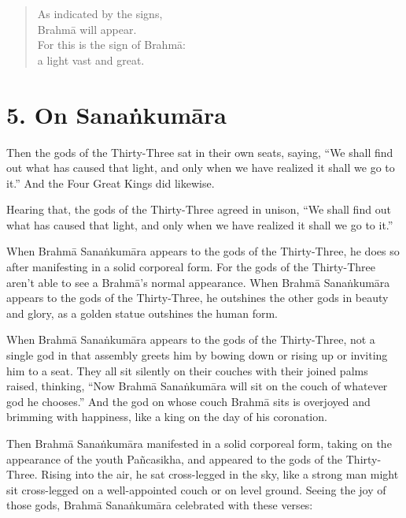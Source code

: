 \documentclass[12pt,openany]{book}%
\begin{document}
\begin{verse}%
As indicated by the signs, \\
\textsanskrit{Brahmā} will appear. \\
For this is the sign of \textsanskrit{Brahmā}: \\
a light vast and great. 

%
\end{verse}

\section*{5. On \textsanskrit{Sanaṅkumāra} }

Then the gods of the Thirty-Three sat in their own seats, saying, “We shall find out what has caused that light, and only when we have realized it shall we go to it.” And the Four Great Kings did likewise. 

Hearing that, the gods of the Thirty-Three agreed in unison, “We shall find out what has caused that light, and only when we have realized it shall we go to it.” 

When \textsanskrit{Brahmā} \textsanskrit{Sanaṅkumāra} appears to the gods of the Thirty-Three, he does so after manifesting in a solid corporeal form. For the gods of the Thirty-Three aren’t able to see a \textsanskrit{Brahmā}’s normal appearance. When \textsanskrit{Brahmā} \textsanskrit{Sanaṅkumāra} appears to the gods of the Thirty-Three, he outshines the other gods in beauty and glory, as a golden statue outshines the human form. 

When \textsanskrit{Brahmā} \textsanskrit{Sanaṅkumāra} appears to the gods of the Thirty-Three, not a single god in that assembly greets him by bowing down or rising up or inviting him to a seat. They all sit silently on their couches with their joined palms raised, thinking, “Now \textsanskrit{Brahmā} \textsanskrit{Sanaṅkumāra} will sit on the couch of whatever god he chooses.” And the god on whose couch \textsanskrit{Brahmā} sits is overjoyed and brimming with happiness, like a king on the day of his coronation. 

Then \textsanskrit{Brahmā} \textsanskrit{Sanaṅkumāra} manifested in a solid corporeal form, taking on the appearance of the youth \textsanskrit{Pañcasikha}, and appeared to the gods of the Thirty-Three. Rising into the air, he sat cross-legged in the sky, like a strong man might sit cross-legged on a well-appointed couch or on level ground. Seeing the joy of those gods, \textsanskrit{Brahmā} \textsanskrit{Sanaṅkumāra} celebrated with these verses: 
\end{document}
